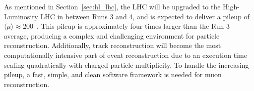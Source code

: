 As mentioned in Section~\ref{sec:hl_lhc}, the LHC will be upgraded to the High-Luminosity LHC in between Runs 3 and 4, and is expected to deliver a pileup of $\langle \mu \rangle \approx 200$~\cite{Schmidt:2016jra}. This pileup is approximately four times larger than the Run 3 average, producing a complex and challenging environment for particle reconstruction. Additionally, track reconstruction will become the most computationally intensive part of event reconstruction due to an execution time scaling quadratically with charged particle multiplicity. To handle the increasing pileup, a fast, simple, and clean software framework is needed for muon reconstruction. 
